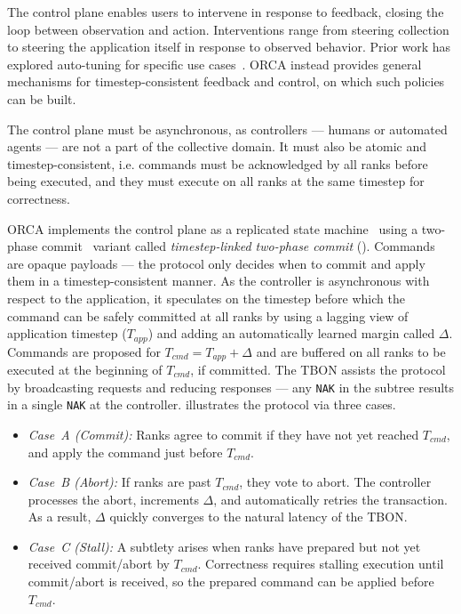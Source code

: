 \figDesignTwopc{}


The control plane enables users to intervene in response to feedback, closing the loop between
observation and action.  Interventions range from steering collection to steering the application itself in response to
observed behavior.
Prior work has explored auto-tuning for specific use cases~\cite{Bened2010:PERISCOPE}.
ORCA instead provides general mechanisms for timestep-consistent feedback and control, on which
such policies can be built.

The control plane must be asynchronous, as 
controllers --- humans or automated agents --- are not a part of the collective domain.
It must also be atomic and timestep-consistent, i.e. commands must be acknowledged by all ranks
before being executed, and they must execute on all ranks at the same timestep for correctness.

ORCA implements the control plane as a replicated state machine~\cite{Schne1990:SMR} using
a two-phase commit~\cite{Gray1978:Notes} variant called \emph{timestep-linked two-phase commit} (\twopc{}).
Commands are opaque payloads --- the protocol only decides when to commit and apply them
in a timestep-consistent manner.
As the controller is asynchronous with respect to the application,
it speculates on the timestep before which the command can be safely committed at all ranks
by using a lagging view of application timestep ($T_{app}$) and adding an automatically
learned margin called $\Delta$.
Commands are proposed for $T_{cmd} = T_{app} + \Delta$ and
are buffered on all ranks to be executed at the beginning of $T_{cmd}$, if committed.
The TBON assists the protocol by broadcasting requests and reducing responses --- any \texttt{NAK}
in the subtree results in a single \texttt{NAK} at the controller.
 illustrates the protocol via three cases.

\begin{itemize}[leftmargin=*]
  \item \emph{Case~A (Commit):}
        Ranks agree to commit if they have not yet reached $T_{cmd}$, and apply the command just before
        $T_{cmd}$.
  \item \emph{Case~B (Abort):}
        If ranks are past $T_{cmd}$, they vote to abort.
        The controller processes the abort, increments $\Delta$, and automatically retries the transaction.
        As a result, $\Delta$ quickly converges to the natural latency of the TBON.
  \item \emph{Case~C (Stall):}
        A subtlety arises when ranks have prepared but not yet received commit/abort by $T_{cmd}$.
        Correctness requires stalling execution until commit/abort is received, so the prepared command can
        be applied before $T_{cmd}$.
\end{itemize}


